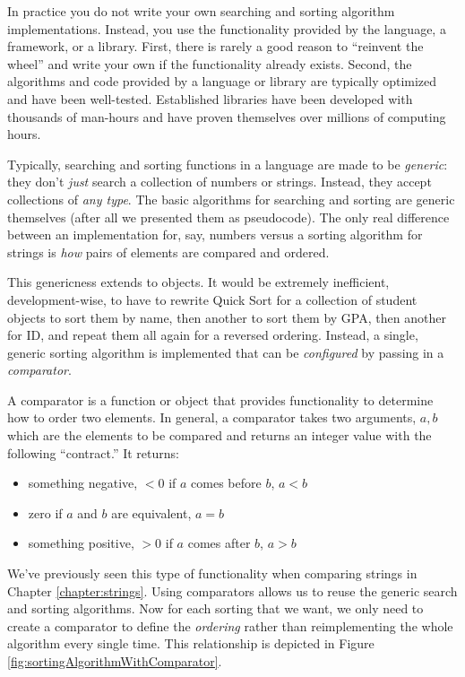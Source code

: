 In practice you do not write your own searching and sorting
algorithm implementations.  Instead, you use the functionality provided
by the language, a framework, or a library.  First, there is rarely a
good reason to ``reinvent the wheel'' and write your own if the functionality
already exists.  Second, the algorithms and code provided by a language
or library are typically optimized and have been well-tested.  Established
libraries have been developed with thousands of man-hours and have proven themselves over millions of computing hours.

Typically, searching and sorting functions in a language are made to
be \emph{generic}: they don't \emph{just} search a collection of numbers
or strings.  Instead, they accept collections of \emph{any type}.  The
basic algorithms for searching and sorting are generic themselves (after
all we presented them as pseudocode).  The only real difference between
an implementation for, say, numbers versus a sorting algorithm for 
strings is \emph{how} pairs of elements are compared and ordered.

This genericness extends to objects.  It would be extremely inefficient, 
development-wise, to have to rewrite Quick Sort for a collection of 
student objects to sort them by name, then another to sort them by GPA, 
then another for ID, and repeat them all again for a reversed ordering.
Instead, a single, generic sorting algorithm is implemented that can
be \emph{configured} by passing in a \emph{comparator}.

A  comparator is a function or object that 
provides functionality to determine how to order two elements.  
In general, a comparator takes two arguments, $a, b$ which are 
the elements to be compared and returns an integer value with 
the following ``contract.''  It returns:
\begin{itemize}
  \item something negative, $< 0$ if $a$ comes before $b$, $a < b$
  \item zero if $a$ and $b$ are equivalent, $a = b$
  \item something positive, $> 0$ if $a$ comes after $b$, $a > b$
\end{itemize}
We've previously seen this type of functionality when comparing strings in
Chapter \ref{chapter:strings}.  Using comparators allows us to reuse
the generic search and sorting algorithms.  Now for each sorting that
we want, we only need to create a comparator to define the \emph{ordering}
rather than reimplementing the whole algorithm every single time.
This relationship is depicted in Figure 
\ref{fig:sortingAlgorithmWithComparator}.

